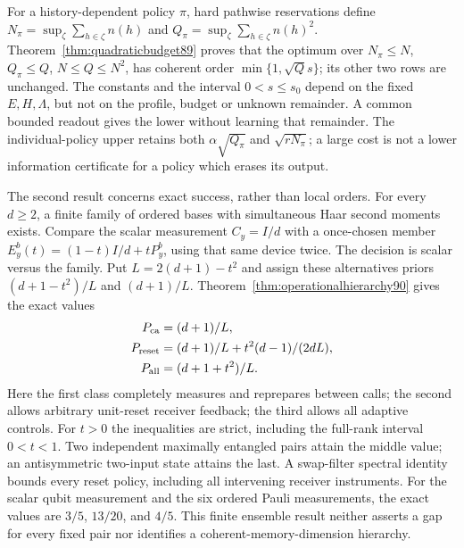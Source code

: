 For a history-dependent policy $\pi$, hard pathwise reservations define
$N_\pi=\sup_\zeta\sum_{h\in\zeta}n(h)$ and
$Q_\pi=\sup_\zeta\sum_{h\in\zeta}n(h)^2$.
Theorem~\ref{thm:quadraticbudget89} proves that the optimum over
$N_\pi\le N$, $Q_\pi\le Q$, $N\le Q\le N^2$, has coherent order
$\min\{1,\sqrt Qs\}$; its other two rows are unchanged.
The constants and the interval $0<s\le s_0$ depend on the fixed
$E,H,\Lambda$, but not on the profile, budget or unknown remainder.
A common bounded readout gives the lower without learning that remainder.
The individual-policy upper retains both $\alpha\sqrt{Q_\pi}$ and
$\sqrt{rN_\pi}$; a large cost is not a lower information certificate
for a policy which erases its output.

The second result concerns exact success, rather than local orders.
For every $d\ge2$, a finite family of ordered bases with simultaneous
Haar second moments exists.  Compare the scalar measurement $C_y=I/d$
with a once-chosen member $E_y^b(t)=(1-t)I/d+tP_y^b$, using that same
device twice.  The decision is scalar versus the family.  Put
$L=2(d+1)-t^2$ and assign these alternatives priors
$(d+1-t^2)/L$ and $(d+1)/L$.  Theorem~\ref{thm:operationalhierarchy90}
gives the exact values
\begin{equation}\label{eq:fronthierarchy90}
\begin{split}
 P_{\rm ca}&=(d+1)/L,\\
 P_{\rm reset}&=(d+1)/L+t^2(d-1)/(2dL),\\
 P_{\rm all}&=(d+1+t^2)/L.
\end{split}
\end{equation}
Here the first class completely measures and reprepares between calls;
the second allows arbitrary unit-reset receiver feedback; the third
allows all adaptive controls.  For $t>0$ the inequalities are strict,
including the full-rank interval $0<t<1$.  Two independent maximally
entangled pairs attain the middle value; an antisymmetric two-input
state attains the last.  A swap-filter spectral identity bounds every
reset policy, including all intervening receiver instruments.
For the scalar qubit measurement and the six ordered Pauli measurements,
the exact values are $3/5$, $13/20$, and $4/5$.
This finite ensemble result neither asserts a gap for every fixed pair
nor identifies a coherent-memory-dimension hierarchy.


